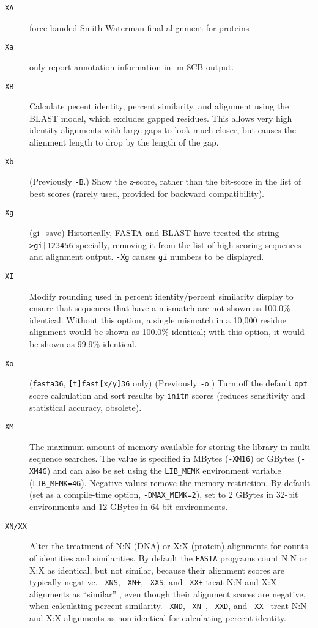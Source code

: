 \documentclass[11pt]{article}
\begin{document}
\begin{description}
\begin{description}
\item[\texttt{XA}] force banded Smith-Waterman final alignment for proteins

\item[\texttt{Xa}] only report annotation information in -m 8CB output.

\item[\texttt{XB}] Calculate pecent identity, percent similarity, and
  alignment using the BLAST model, which excludes gapped residues.
  This allows very high identity alignments with large gaps to look
  much closer, but causes the alignment length to drop by the length
  of the gap.

\item[\texttt{Xb}] (Previously \texttt{-B}.)  Show the z-score, rather
  than the bit-score in the list of best scores (rarely used, provided
  for backward compatibility).

\item[\texttt{Xg}] (gi\_save) Historically, FASTA and BLAST have
  treated the string \texttt{>gi|123456} specially, removing it from the list
  of high scoring sequences and alignment output.  \texttt{-Xg}
  causes \texttt{gi} numbers to be displayed.

\item[\texttt{XI}] Modify rounding used in percent identity/percent
  similarity display to ensure that sequences that have a mismatch are
  not shown as 100.0\% identical.  Without this option, a single
  mismatch in a 10,000 residue alignment would be shown as 100.0\%
  identical; with this option, it would be shown as 99.9\%
  identical.

\item[\texttt{Xo}] (\texttt{fasta36}, \texttt{[t]fast[x/y]36} only)
  (Previously \texttt{-o}.) Turn off the default \texttt{opt} score
  calculation and sort results by \texttt{initn} scores (reduces
  sensitivity and statistical accuracy, obsolete).

\item[\texttt{XM}] The maximum amount of memory available for storing
  the library in multi-sequence searches. The value is specified in
  MBytes (\texttt{-XM16}) or GBytes (\texttt{-XM4G}) and can also be
  set using the \texttt{LIB\_MEMK} environment variable
  (\texttt{LIB\_MEMK=4G}).  Negative values remove the memory
  restriction. By default (set as a compile-time option,
  \texttt{-DMAX\_MEMK=2}), set to 2 GBytes in 32-bit environments and
  12 GBytes in 64-bit environments.

\item[\texttt{XN/XX}] Alter the treatment of N:N (DNA) or X:X
  (protein) alignments for counts of identities and similarities. By
  default the \texttt{FASTA} programs count N:N or X:X as identical,
  but not similar, because their alignment scores are typically
  negative. \texttt{-XNS}, \texttt{-XN+}, \texttt{-XXS}, and
  \texttt{-XX+} treat N:N and X:X alignments as ``similar'' , even
  though their alignment scores are negative, when calculating percent
  similarity. \texttt{-XND}, \texttt{-XN-}, \texttt{-XXD}, and
  \texttt{-XX-} treat N:N and X:X alignments as non-identical for
  calculating percent identity.


\end{description}
\end{description}
\end{document}
